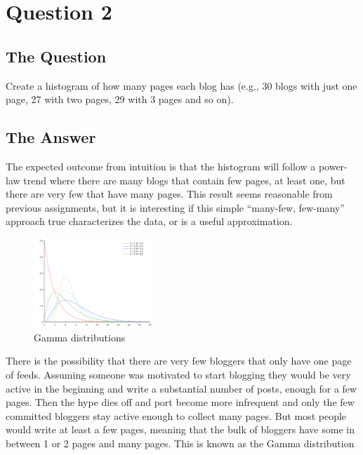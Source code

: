 \section{Question 2}

\subsection{The Question}

\begin{flushleft}

Create a histogram of how many pages each blog has (e.g., 30
blogs with just one page, 27 with two pages, 29 with 3 pages and 
so on).

\end{flushleft}
\subsection{The Answer}



The expected outcome from intuition is that the histogram will follow a power-law trend where there are many blogs that contain few pages, at least one, but there are very few that have many pages. This result seems reasonable from previous assignments, but it is interesting if this simple ``many-few, few-many'' approach true characterizes the data, or is a useful approximation. 

\begin{figure}
  \vspace{-20pt}
  \begin{center}
    \includegraphics[width=0.4\textwidth]{gamma}
  \end{center}
  \vspace{-20pt}
  \caption{Gamma distributions}
  \vspace{-10pt}
\end{figure}



There is the possibility that there are very few bloggers that only have one page of feeds. Assuming someone was motivated to start blogging they would be very active in the beginning and write a substantial number of posts, enough for a few pages. Then the hype dies off and port become more infrequent and only the few committed bloggers stay active enough to collect many pages. But most people would write at least a few pages, meaning that the bulk of bloggers have some in between 1 or 2 pages and many pages. This is known as the Gamma distribution

